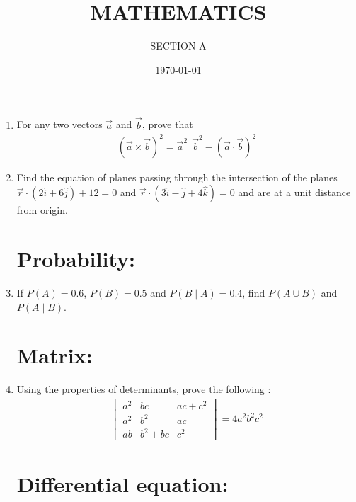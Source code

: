 \documentclass[10pt,-letter paper]{article}
\title{MATHEMATICS}
\author{SECTION A}
\date{\today}
\providecommand{\brak}[1]{\ensuremath{\left(#1\right)}}
\newcommand{\mydet}[1]{\ensuremath{\begin{vmatrix}#1\end{vmatrix}}}
\begin{document}
\maketitle

\begin{enumerate}

\begin{enumerate}

\section{Vector:}

\item For any two vectors $\overrightarrow{a}$ and $\overrightarrow{b}$, prove that
\begin{align*}
	\brak{{\overrightarrow{a} \times \overrightarrow{b}}}^{2} = {\overrightarrow{a}^{2}}~~{\overrightarrow{b}^{2}} - \brak{{\overrightarrow{a} \cdot \overrightarrow{b}}}^{2} 
\end{align*}

\item Find the equation of planes passing through the intersection  of the planes $\overrightarrow{r} \cdot \brak{2\hat{i}+6\hat{j}}+12=0$ and $\overrightarrow{r} \cdot \brak{3\hat{i}-\hat{j}+4\hat{k}}=0$ and are at a unit distance from origin.

\section{Probability:}

\item If $P\brak{A}=0.6$, $P\brak{B}=0.5$ and $P\brak{B\mid A}=0.4$, find $P\brak{A\cup B}$ and $P\brak{A\mid B}$.

\section{Matrix:}

\item Using the properties of determinants, prove the following :
        \begin{align*}
		\mydet{a^{2} & bc & ac+c^{2} \\ a^{2} & b^{2} & ac \\ ab & b^{2}+bc & c^{2} } = 4a^{2}b^{2}c^{2} 
	  \end{align*}
 
\section{Differential equation:}


\end{enumerate}
\end{enumerate}
\end{document}
